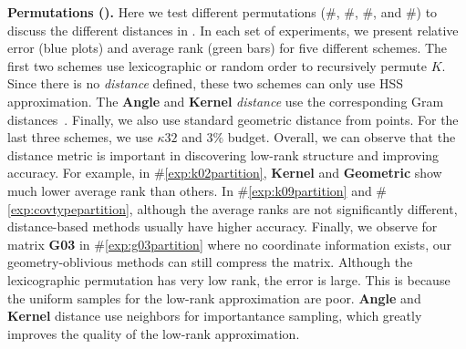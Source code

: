 \textbf{Permutations ().}
Here we test different permutations
(\#\rownumber\label{exp:k02partition},
\#\rownumber\label{exp:k09partition},
\#\rownumber\label{exp:covtypepartition}, and
\#\rownumber\label{exp:g03partition}) 
to discuss the different distances in \gofmm{}.
In each set of experiments, we present relative
error (blue plots) and average rank (green bars)
for five different schemes.
The first two schemes use lexicographic or random order
to recursively permute $K$. 
Since there is no \emph{distance} defined, 
these two schemes can only use HSS approximation.
The \textbf{Angle} and \textbf{Kernel}
\emph{distance} use the corresponding Gram distances~.
Finally, we also use standard geometric distance from points. 
For the last three schemes, we use $\kappa32$ and $3\%$
budget. Overall, we can observe that the distance metric
is important in discovering low-rank structure
and improving accuracy.
For example, in \#\ref{exp:k02partition}, \textbf{Kernel} and 
\textbf{Geometric} show much lower average rank
than others.
In \#\ref{exp:k09partition} and \#\ref{exp:covtypepartition},
although the average ranks are not significantly
different, distance-based methods usually have higher accuracy. 
Finally, we observe for matrix \textbf{G03} in \#\ref{exp:g03partition} where no coordinate information exists,
our geometry-oblivious methods can still compress
the matrix. Although the lexicographic permutation has
very low rank, the error is large. This is because
the uniform samples for the low-rank approximation are poor. 
\textbf{Angle} and \textbf{Kernel} distance use neighbors for importantance sampling, 
which greatly improves the quality of the low-rank approximation.


\begin{table}

\caption{
  Wall-clock time comparison (in seconds) between \texttt{HODLR},
  \texttt{STRUMPACK}, and \texttt{GOFMM}.
  For \textbf{K02}--\textbf{K12}, we use $N=36K$. \textbf{K17} uses $N=32K$,
  and  \textbf{G03} uses $N=65K$.
  For all software, we use leaf node size $m512$ and $1024$ right hand sides.
  We control other parameters ($\tau$ and $s$) for each software to target 
  the same relative error (\num{1E-4}).
%  
}
\label{tab:existingSoftware}
\end{table}

